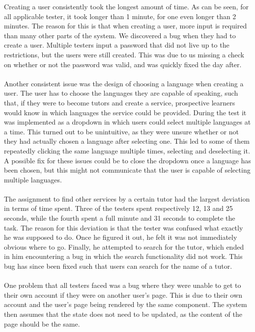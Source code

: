 Creating a user consistently took the longest amount of time.
As can be seen, for all applicable tester, it took longer than 1 minute, for one even longer than 2 minutes.
The reason for this is that when creating a user, more input is required than many other parts of the system.
We discovered a bug when they had to create a user. 
Multiple testers input a password that did not live up to the restrictions, but the users were still created. 
This was due to us missing a check on whether or not the password was valid, and was quickly fixed the day after.
\\\\
Another consistent issue was the design of choosing a language when creating a user.
The user has to choose the languages they are capable of speaking, such that, if they were to become tutors and create a service, prospective learners would know in which languages the service could be provided.
During the test it was implemented as a dropdown in which users could select multiple languages at a time.
This turned out to be unintuitive, as they were unsure whether or not they had actually chosen a language after selecting one.
This led to some of them repeatedly clicking the same language multiple times, selecting and deselecting it.
A possible fix for these issues could be to close the dropdown once a language has been chosen, but this might not communicate that the user is capable of selecting multiple languages.
\\\\
The assignment to find other services by a certain tutor had the largest deviation in terms of time spent.
Three of the testers spent respectively 12, 13 and 25 seconds, while the fourth spent a full minute and 31 seconds to complete the task.
The reason for this deviation is that the tester was confused what exactly he was supposed to do.
Once he figured it out, he felt it was not immediately obvious where to go.
Finally, he attempted to search for the tutor, which ended in him encountering a bug in which the search functionality did not work.
This bug has since been fixed such that users can search for the name of a tutor.
\\\\
One problem that all testers faced was a bug where they were unable to get to their own account if they were on another user's page.
This is due to their own account and the user's page being rendered by the same component.
The system then assumes that the state does not need to be updated, as the content of the page should be the same.
